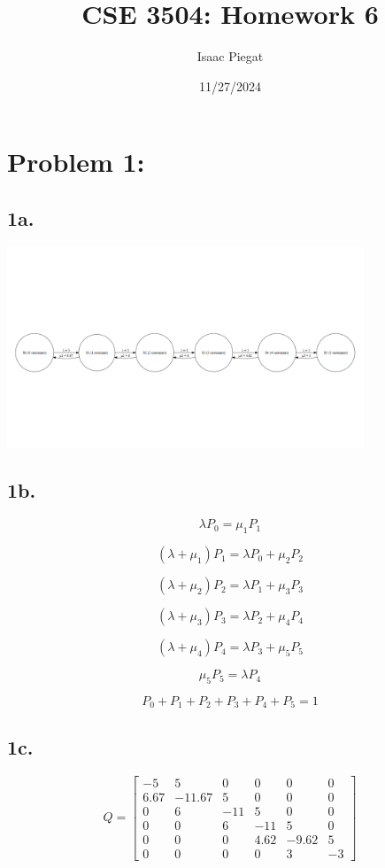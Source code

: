 \documentclass[12pt]{article}
\title{CSE 3504: Homework 6}
\author{Isaac Piegat}
\date{11/27/2024}
\begin{document}
\maketitle

\section*{Problem 1:}

\subsection*{1a.}

\begin{center}
    \includegraphics[width=0.8\textwidth]{state_transition_diagram.png}
\end{center}

\subsection*{1b.}

\[
\lambda P_0 = \mu_1 P_1
\]

\[
(\lambda + \mu_1)P_1 = \lambda P_0 + \mu_2 P_2
\]

\[
(\lambda + \mu_2)P_2 = \lambda P_1 + \mu_3 P_3
\]

\[
(\lambda + \mu_3)P_3 = \lambda P_2 + \mu_4 P_4
\]

\[
(\lambda + \mu_4)P_4 = \lambda P_3 + \mu_5 P_5
\]

\[
\mu_5 P_5 = \lambda P_4
\]

\[
P_0 + P_1 + P_2 + P_3 + P_4 + P_5 = 1
\]

\subsection*{1c.}
\[
Q =
\begin{bmatrix}
-5 & 5 & 0 & 0 & 0 & 0 \\
6.67 & -11.67 & 5 & 0 & 0 & 0 \\
0 & 6 & -11 & 5 & 0 & 0 \\
0 & 0 & 6 & -11 & 5 & 0 \\
0 & 0 & 0 & 4.62 & -9.62 & 5 \\
0 & 0 & 0 & 0 & 3 & -3
\end{bmatrix}
\]
\end{document}
